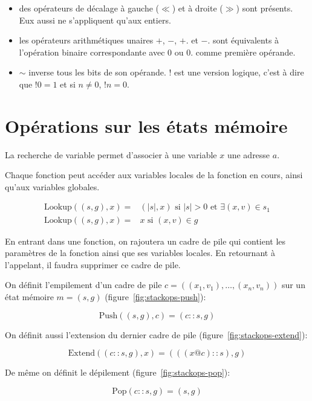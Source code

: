 \begin{itemize}
\item
  des opérateurs de décalage à gauche ($\ll$) et à droite ($\gg$) sont présents.
  Eux aussi ne s'appliquent qu'aux entiers.

\item
  les opérateurs arithmétiques unaires $+$, $-$, $+.$ et $-.$ sont équivalents à
  l'opération binaire correspondante avec $0$ ou $0.$ comme première opérande.

\item
  $\sim$ inverse tous les bits de son opérande. $!$ est une version logique,
  c'est à dire que $!0 = 1$ et si $n ≠ 0$, $!n = 0$.
\end{itemize}


\section{Opérations sur les états mémoire}
\label{sec:memops}


\begin{definition}

  La recherche de variable permet d'associer à une variable $x$ une adresse $a$.

  Chaque fonction peut accéder aux variables locales de la fonction en cours,
  ainsi qu'aux variables globales.

  \begin{align*}
    \mathrm{Lookup} ((s, g), x) = & (|s|, x)
                                    \mbox{ si }|s| > 0
                                    \mbox{ et }∃ (x, v) ∈ s_1 \\
    \mathrm{Lookup} ((s, g), x) = & x \mbox{ si } (x, v) ∈ g
  \end{align*}

\end{definition}

En entrant dans une fonction, on rajoutera un cadre de pile qui contient les
paramètres de la fonction ainsi que ses variables locales. En retournant à
l'appelant, il faudra supprimer ce cadre de pile.

\begin{definition}

  On définit l'empilement d'un cadre de pile $c = ((x_1, v_1), …, (x_n, v_n))$
  sur un état mémoire $m = (s, g)$ (figure~\ref{fig:stackops-push}):

  \[
    \mathrm{Push}((s, g), c) = (c::s, g)
  \]

  On définit aussi l'extension du dernier cadre de pile
  (figure~\ref{fig:stackops-extend}):

  \[
    \mathrm{Extend}((c::s, g), x) = (((x @ c) :: s), g)
  \]

  De même on définit le dépilement (figure~\ref{fig:stackops-pop}):

  \[
    \mathrm{Pop}(c::s, g) = (s, g)
  \]

\end{definition}

